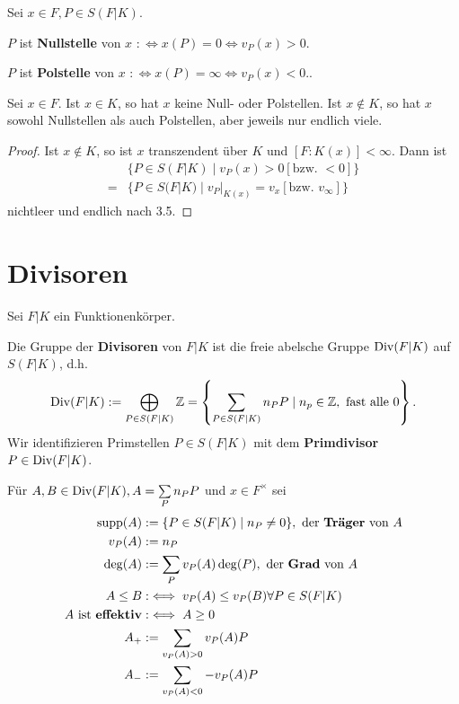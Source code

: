 \begin{definition}
    Sei $x \in F, P \in S(F|K)$. 
    
    $P$ ist \textbf{Nullstelle} von $x$ $: \iff x(P) = 0 \iff v_P(x) > 0$.

    $P$ ist \textbf{Polstelle} von $x$ $:\iff x(P) = \infty \iff v_P(x) < 0$..
\end{definition}

\begin{satz}
    Sei $x \in F$. Ist $x \in K$, so hat $x$ keine Null- oder Polstellen. Ist $x \notin K$, so hat $x$ sowohl Nullstellen als auch Polstellen,
    aber jeweils nur endlich viele.
\end{satz}
\begin{proof}
    Ist $x \notin K$, so ist $x$ transzendent über $K$ und $[F:K(x)] < \infty$.
    Dann ist 
    \begin{align*}
        &\{P \in S(F|K) \mid v_P(x) > 0 [\text{bzw. } < 0]\}\\
        =& \{P \in S(F|K) \mid v_P|_{K(x)} = v_x [\text{bzw. } v_{\infty}]\}
    \end{align*}
    nichtleer und endlich nach 3.5.
\end{proof}

\section{Divisoren}
Sei $F|K$ ein Funktionenkörper.

\begin{definition}
    Die Gruppe der \textbf{Divisoren} von $F|K$ ist die freie abelsche Gruppe $\operatorname{Div}(F|K)$ auf $S(F|K)$, d.h.
    $$ \operatorname{Div}(F|K) := \bigoplus\limits_{P \in S(F|K)} \mathbb{Z} = \left\{\sum\limits_{P \in S(F|K)} n_P P \mid n_p \in \mathbb{Z}, \text{ fast alle }0\right\}.$$
    Wir identifizieren Primstellen $P \in S(F|K)$ mit dem \textbf{Primdivisor} $P \in \operatorname{Div}(F|K)$.

    Für $A,B \in \operatorname{Div}(F|K), A = \sum\limits_P n_P P$ und $x \in F^{\times}$ sei 
    \begin{align*}
        \operatorname{supp}(A) &:= \{P \in S(F|K) \mid n_P \ne 0\}, \text{ der \textbf{Träger} von }A\\
        v_P(A) &:= n_P\\
        \deg(A) &:= \sum\limits_P v_P(A) \deg(P), \text{ der \textbf{Grad} von }A\\
        A \leq B &:\iff v_P(A) \leq v_P(B) \forall P \in S(F|K)\\
        A \text{ ist \textbf{effektiv}} &:\iff A \geq 0\\
        A_+ &:= \sum\limits_{v_P(A) > 0} v_P(A) P\\
        A_- &:= \sum\limits_{v_P(A) < 0} -v_P(A) P
    \end{align*}
\end{definition}

